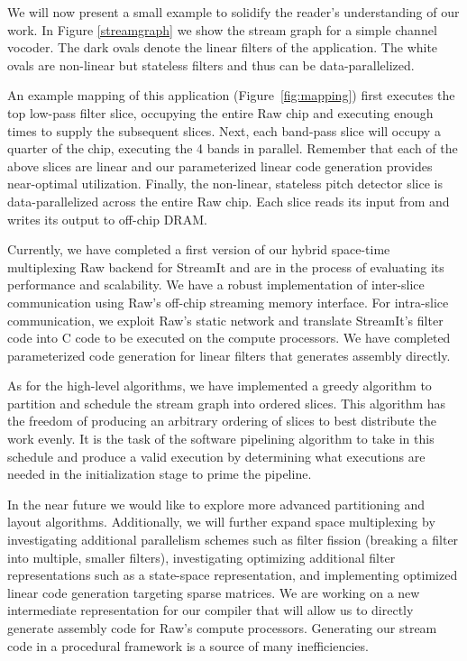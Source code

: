 \documentclass{csailabstractbook}
\begin{document}
We will now present a small example to solidify the reader's
understanding of our work.  In Figure \ref{streamgraph} we show the
stream graph for a simple channel vocoder.  The dark ovals denote the
linear filters of the application.  The white ovals are non-linear but
stateless filters and thus can be data-parallelized.

An example mapping of this application (Figure~\ref{fig:mapping})
first executes the top low-pass filter slice, occupying the entire Raw
chip and executing enough times to supply the subsequent slices. Next,
each band-pass slice will occupy a quarter of the chip, executing the
4 bands in parallel.  Remember that each of the above slices are
linear and our parameterized linear code generation provides
near-optimal utilization. Finally, the non-linear, stateless pitch
detector slice is data-parallelized across the entire Raw chip. Each
slice reads its input from and writes its output to off-chip DRAM.
 
Currently, we have completed a first version of our hybrid space-time
multiplexing Raw backend for StreamIt and are in the process of
evaluating its performance and scalability.  We have a robust
implementation of inter-slice communication using Raw's off-chip
streaming memory interface.  For intra-slice communication, we exploit
Raw's static network and translate StreamIt's filter code into C
code to be executed on the compute processors.  We have completed
parameterized code generation for linear filters that generates
assembly directly.   

As for the high-level algorithms, we have implemented a greedy
algorithm to partition and schedule the stream graph into ordered slices.
This algorithm has the freedom of producing an arbitrary ordering of slices
to best distribute the work evenly. It is the task of the software
pipelining algorithm to take in this schedule and produce a valid
execution by determining what executions are needed in the initialization
stage to prime the pipeline.

In the near future we would like to explore more advanced partitioning
and layout algorithms.  Additionally, we will further expand space
multiplexing by investigating additional parallelism schemes such as
filter fission (breaking a filter into multiple, smaller filters),
investigating optimizing additional filter representations such as a
state-space representation, and implementing optimized linear code
generation targeting sparse matrices.  We are working on a new
intermediate representation for our compiler that will allow us to
directly generate assembly code for Raw's compute
processors. Generating our stream code in a procedural framework is a
source of many inefficiencies.
 
\end{document}

